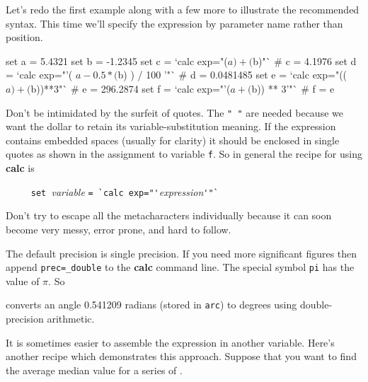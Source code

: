 \documentclass[twoside,11pt,nolof]{starlink}
\providecommand{\NDFref}[1]{\xref{#1}{sun33}{}}
\begin{document}
Let's redo the first example along with a few more to illustrate the
recommended syntax.  This time we'll specify the expression by parameter
name rather than position.

\begin{small}
\begin{terminalv}
     set a = 5.4321
     set b = -1.2345
     set c = `calc exp="($a)+($b)"`                     # c = 4.1976
     set d = `calc exp="'( $a - 0.5 * ($b) ) / 100 '"`  # d = 0.0481485
     set e = `calc exp="(($a)+($b))**3"`                # e = 296.2874
     set f = `calc exp="'($a + ($b)) ** 3'"`            # f = e
\end{terminalv}
\end{small}
Don't be intimidated by the surfeit of quotes.  The \texttt{"~"} are needed
because we want the dollar to retain its variable-substitution meaning.
If the expression contains embedded spaces (usually for clarity) it
should be enclosed in single quotes as shown in the assignment to
variable \texttt{f}.  So in general the recipe for using \textbf{calc} is

\verb#     set #\emph{variable} \verb#= `calc exp="'#\emph{expression}\verb#'"`#

Don't try to escape all the metacharacters individually because it can
soon become very messy, error prone, and hard to follow.
\medskip

The default precision is single precision.  If you need more
significant figures then append \texttt{prec=\_double} to the \textbf{calc}
command line.  The special symbol \texttt{pi} has the value of $\pi$.  So

\begin{small}
\end{small}
converts an angle 0.541209 radians (stored in \texttt{arc}) to degrees
using double-precision arithmetic.

It is sometimes easier to assemble the expression in another variable.
Here's another recipe which demonstrates this approach.  Suppose that you
want to find the average median value for a series of \NDFref{\textsf{NDF}s}.
\end{document}
